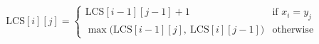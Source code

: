 \[
\text{LCS}[i][j] =
\begin{cases}
\text{LCS}[i-1][j-1] + 1 & \text{if } x_i = y_j\\[2pt]
\max\bigl(\text{LCS}[i-1][j],\ \text{LCS}[i][j-1]\bigr) & \text{otherwise}
\end{cases}
\]
